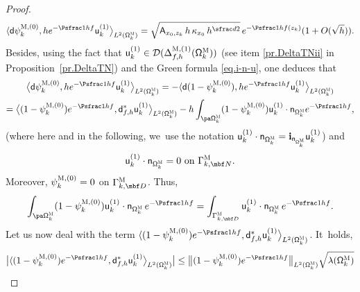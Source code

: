 \begin{proof}
\begin{equation}\label{eq.P11}
\langle \mathsf d \psi^{\textsc{M},(0)}_k, h e^{-\Psfrac 1hf} \mathsf u^{(1)}_k \big \rangle_{ L^2(\mathsf \Omega_k^{\textsc{M}})}=\sqrt{\mathsf A_{x_0,z_k}\, h\, \kappa_{x_0}\, h^{\sfrac d2}}\, e^{-\Psfrac 1h f(z_k)} (1+O(\sqrt h)).
\end{equation}
\pagebreak[2]
Besides, using the fact that $\mathsf
u^{(1)}_k \in \mathcal D(\Delta_{f,h}^{\textsc{M},(1)} (\mathsf
\Omega_k^{\textsc{M}}))$ (see item \eqref{pr.DeltaTNii} in
Proposition~\ref{pr.DeltaTN}) and the Green formula \eqref{eq.i-n-u}, one deduces that
\begin{multline}
\label{eq.P12}
\bigl\langle \mathsf d \psi^{\textsc{M},(0)}_k, h e^{-\Psfrac 1hf} \mathsf u^{(1)}_k \big \rangle_{ L^2(\mathsf \Omega_k^{\textsc{M}})}= -\langle \mathsf d (1- \psi^{\textsc{M},(0)}_k), h e^{-\Psfrac 1hf} \mathsf u^{(1)}_k \big \rangle_{ L^2(\mathsf \Omega_k^{\textsc{M}})}\\
= \bigl\langle (1- \psi^{\textsc{M},(0)}_k) e^{-\Psfrac 1hf}, \mathsf d_{f,h}^* \mathsf u^{(1)}_k \big \rangle_{ L^2(\mathsf \Omega_k^{\textsc{M}})} -h\int_{\pa \mathsf \Omega_k^{\textsc{M}}} (1- \psi^{\textsc{M},(0)}_k) \mathsf u^{(1)}_k \cdot \mathsf n_{ \mathsf \Omega_k^{\textsc{M}} } e^{-\Psfrac 1hf},
\end{multline}
(where here and in the following, we~use the notation $ \mathsf
u^{(1)}_k \cdot \mathsf n_{ \mathsf \Omega_k^{\textsc{M}}
}=\mathbf{i}_{\mathsf n_{ \mathsf \Omega_k^{\textsc{M}}
}} \mathsf
u^{(1)}_k$) and
\[
\mathsf u^{(1)}_k
\cdot \mathsf n_{ \mathsf \Omega_k^{\textsc{M}} }= 0 \text{ on } \Gamma_{k,\mbf N}^{\textsc{M}}.
\]
Moreover, $\psi^{\textsc{M},(0)}_k=0$ on $\Gamma_{k,\mbf
D}^{\textsc{M}}$. Thus,
\begin{equation}\label{eq.P13}
\int_{\pa \mathsf \Omega_k^{\textsc{M}}} (1- \psi^{\textsc{M},(0)}_k) \mathsf u^{(1)}_k \cdot \mathsf n_{ \mathsf \Omega_k^{\textsc{M}} } \, e^{-\Psfrac 1hf}=\int_{\Gamma_{k,\mbf D}^{\textsc{M}}} \mathsf u^{(1)}_k \cdot \mathsf n_{ \mathsf \Omega_k^{\textsc{M}} } \, e^{-\Psfrac 1hf}.
\end{equation}
Let us now deal with the term $\langle (1- \psi^{\textsc{M},(0)}_k) e^{-\Psfrac 1hf}, \mathsf d_{f,h}^* \mathsf u^{(1)}_k \big \rangle_{ L^2(\mathsf \Omega_k^{\textsc{M}})}$. It~holds,
\begin{align*}
\bigl \vert \langle (1- \psi^{\textsc{M},(0)}_k) e^{-\Psfrac 1hf}, \mathsf d_{f,h}^* \mathsf u^{(1)}_k \bigr \rangle_{ L^2(\mathsf \Omega_k^{\textsc{M}})}\big \vert &\le\bigl \Vert (1- \psi^{\textsc{M},(0)}_k) e^{-\Psfrac 1hf} \bigr \Vert_{ L^2(\mathsf \Omega_k^{\textsc{M}})} \sqrt{\lambda(\mathsf \Omega_k^{\textsc{M}}) }\\

\end{align*}
\end{proof}
